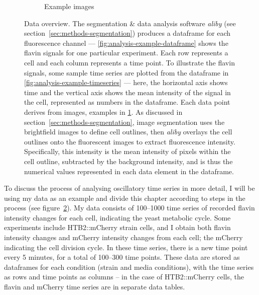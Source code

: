 \begin{figure}
\begin{subfigure}[htpb]{0.5\textwidth}
   \caption{
     Example images
   }
   \label{fig:analysis-example-images}
  \end{subfigure}
  \caption{
    Data overview.
    The segmentation \& data analysis software \textit{aliby} (see section~\ref{sec:methods-segmentation}) produces a dataframe for each fluorescence channel --- \ref{fig:analysis-example-dataframe} shows the flavin signals for one particular experiment.
    Each row represents a cell and each column represents a time point.
    To illustrate the flavin signals, some sample time series are plotted from the dataframe in \ref{fig:analysis-example-timeseries} --- here, the horizontal axis shows time and the vertical axis shows the mean intensity of the signal in the cell, represented as numbers in the dataframe.
    Each data point derives from images, examples in \ref{fig:analysis-example-images}.
    As discussed in section~\ref{sec:methods-segmentation},
    image segmentation uses the brightfield images to define cell outlines, then \textit{aliby} overlays the cell outlines onto the fluorescent images to extract fluorescence intensity.
    Specifically, this intensity is the mean intensity of pixels within the cell outline, subtracted by the background intensity, and is thus the numerical values represented in each data element in the dataframe.
  }
  \label{fig:analysis-data-overview}
\end{figure}

To discuss the process of analysing oscillatory time series in more detail, I will be using my data as an example and divide this chapter according to steps in the process (see figure~\ref{fig:analysis-data-overview}).
My data consists of 100--1000 time series of recorded flavin intensity changes for each cell, indicating the yeast metabolic cycle.
Some experiments include HTB2::mCherry strain cells, and I obtain both flavin intensity changes and mCherry intensity changes from each cell;
the mCherry indicating the cell division cycle.
In these time series, there is a new time point every 5 minutes, for a total of 100--300 time points.
These data are stored as dataframes for each condition (strain and media conditions), with the time series as rows and time points as columns --
in the case of HTB2::mCherry cells, the flavin and mCherry time series are in separate data tables.

